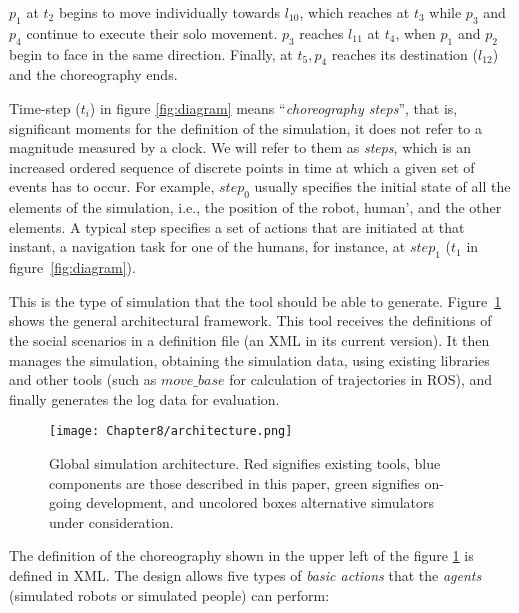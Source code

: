 $p_1$ at $t_2$ begins to move individually towards $l_{10}$, which reaches at $t_3$ while $p_3$ and $p_4$ continue to execute their solo movement. $p_3$ reaches $l_{11}$ at $t_4$, when $p_1$ and $p_2$ begin to face in the same direction. Finally, at $t_5, p_4$ reaches its destination ($l_{12}$) and the choreography ends.

Time-step ($t_i$) in figure \ref{fig:diagram} means ``\emph{choreography steps}'', that is, significant moments for the definition of the simulation, it does not refer to a magnitude measured by a clock. We will refer to them as \emph{steps}, which is an increased ordered sequence of discrete points in time at which a given set of events has to occur. For example, $step_0$ usually specifies the initial state of all the elements of the simulation, i.e., the position of the robot, human', and the other elements. A typical step specifies a set of actions that are initiated at that instant, a navigation task for one of the humans, for instance, at $step_1$ ($t_1$ in figure~\ref{fig:diagram}).


This is the type of simulation that the tool should be able to generate. Figure~\ref{fig:imhus_architecture} shows the general architectural framework. This tool receives the definitions of the social scenarios in a definition file (an XML in its current version). It then manages the simulation, obtaining the simulation data, using existing libraries and other tools (such as $move\_base$ for calculation of trajectories in ROS), and finally generates the log data for evaluation.

\begin{figure}[h!]%
    \centering
    \texttt{[image: Chapter8/architecture.png]}
    \caption{Global simulation architecture. Red signifies existing tools, blue components are those described in this paper, green signifies on-going development, and uncolored boxes alternative simulators under consideration.}
    \label{fig:imhus_architecture}
\end{figure}

The definition of the choreography shown in the upper left of the figure \ref{fig:imhus_architecture} is defined in XML. The design allows five types of \emph{basic actions} that the \emph{agents} (simulated robots or simulated people) can perform:

